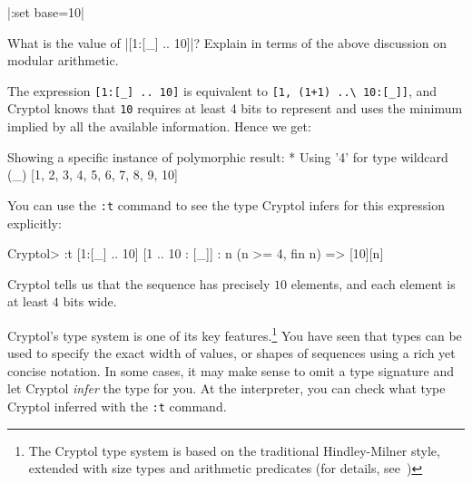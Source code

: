 \restartrepl
\hidereplin|:set base=10|
\begin{Exercise}\label{ex:arith:10}
  What is the value of \replin|[1:[_] .. 10]|? Explain in terms of the above
  discussion on modular arithmetic.\indModular
\end{Exercise}
\begin{Answer}
  The expression \Verb|[1:[_] .. 10]| is equivalent to
  \Verb|[1, (1+1) ..\ 10:[_]]|, and Cryptol knows that \Verb|10|
  requires at least 4 bits to represent and uses the minimum implied
  by all the available information. Hence we get:
\begin{reploutVerb}
  Showing a specific instance of polymorphic result:
    * Using '4' for type wildcard (_)
  [1, 2, 3, 4, 5, 6, 7, 8, 9, 10]
\end{reploutVerb}
  You can use the \Verb|:t|
  command to see the type Cryptol infers for this expression explicitly:
\begin{replPrompt}
    Cryptol> :t [1:[_] .. 10]
    [1 .. 10 : [_]] : {n} (n >= 4, fin n) => [10][n]
\end{replPrompt}
Cryptol tells us that the sequence has precisely $10$ elements, and each
element is at least $4$ bits wide.
\end{Answer}


Cryptol's type system is one of its key features.\footnote{The Cryptol
  type system is based on the traditional Hindley-Milner style,
  extended with size types and arithmetic
  predicates (for details, see~\cite{erkok-carlsson-wick-cryptolCoverification-09,
    erkok-matthews-cryptolEqChecking-09, Hin97})}  You have seen that
types can be used to specify the exact width of values, or shapes of
sequences using a rich yet concise notation.  In some cases, it may
make sense to omit a type signature and let Cryptol {\em infer} the
type for you. At the interpreter, you can check what type Cryptol
inferred with the \texttt{:t} command.


